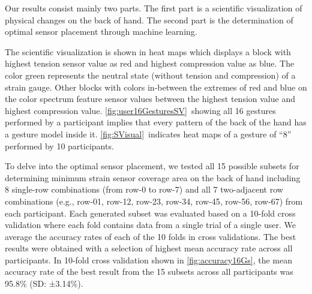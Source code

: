 \documentclass{sigchi}
\begin{document}
Our results consist mainly two parts. The first part is a scientific visualization of physical changes on the back of hand. The second part is the determination of optimal sensor placement through machine learning.

The scientific visualization is shown in heat maps which displays a block with highest tension sensor value as red and highest compression value as blue. The color green represents the neutral state (without tension and compression) of a strain gauge. Other blocks with colors in-between the extremes of red and blue on the color spectrum feature sensor values between the highest tension value and highest compression value. \autoref{fig:user16GesturesSV}\ showing all 16 gestures performed by a participant implies that every pattern of the back of the hand has a gesture model inside it. \autoref{fig:SVisual}\ indicates heat maps of a gesture of ``8'' performed by 10 participants. 


To delve into the optimal sensor placement, we tested all 15 possible subsets for determining minimum strain sensor coverage area on the back of hand including 8 single-row combinations (from row-0 to row-7) and all 7 two-adjacent row combinations (e.g., row-01, row-12, row-23, row-34, row-45, row-56, row-67) from each participant.
Each generated subset was evaluated based on a 10-fold cross validation where each fold contains data from a single trial of a single user. We average the accuracy rates of each of the 10 folds in cross validations.
The best results were obtained with a selection of highest mean accuracy rate across all participants.
In 10-fold cross validation shown in \autoref{fig:accuracy16Gs}, the mean accuracy rate of the best result from the 15 subsets across all participants was 95.8\% (SD: ±3.14\%).
\end{document}
